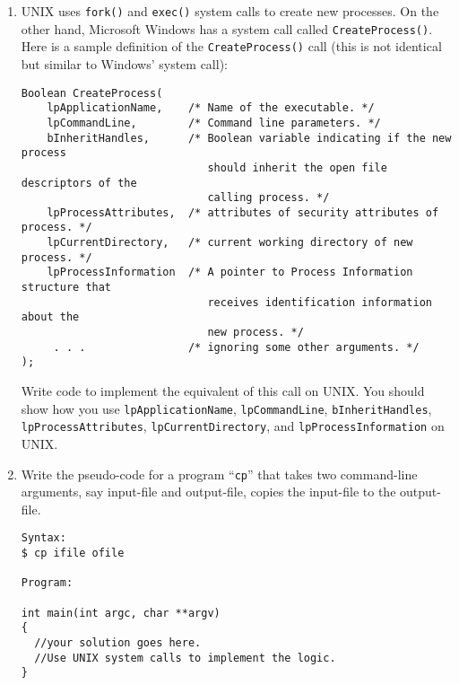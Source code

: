 \begin{enumerate}
\item
UNIX uses {\tt fork()} and {\tt exec()} system calls to create new processes. On the other hand, Microsoft
Windows has a system call called {\tt CreateProcess()}.
Here is a sample definition of the
{\tt CreateProcess()} call
(this is not identical but similar to Windows’ system call):
\begin{verbatim}
Boolean CreateProcess(
    lpApplicationName,    /* Name of the executable. */
    lpCommandLine,        /* Command line parameters. */
    bInheritHandles,      /* Boolean variable indicating if the new process
                             should inherit the open file descriptors of the
                             calling process. */
    lpProcessAttributes,  /* attributes of security attributes of process. */
    lpCurrentDirectory,   /* current working directory of new process. */
    lpProcessInformation  /* A pointer to Process Information structure that
                             receives identification information about the
                             new process. */
     . . .                /* ignoring some other arguments. */
);
\end{verbatim}
Write code to implement the equivalent of this call on UNIX. You should show how you use
{\tt lpApplicationName}, {\tt lpCommandLine}, {\tt bInheritHandles},
{\tt lpProcessAttributes}, {\tt lpCurrentDirectory}, and {\tt lpProcessInformation}
on
UNIX.

\item Write the pseudo-code for a program ``{\tt cp}'' that takes two command-line arguments, say input-file and output-file, copies the input-file to the output-file.
\begin{verbatim}
Syntax:
$ cp ifile ofile

Program:

int main(int argc, char **argv)
{
  //your solution goes here.
  //Use UNIX system calls to implement the logic.
}
\end{verbatim}

\end{enumerate}

